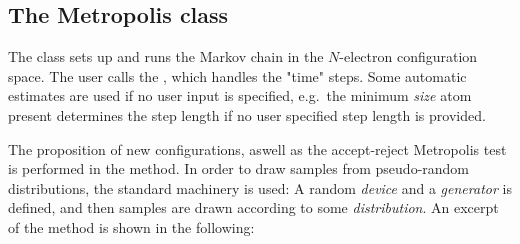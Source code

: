 \documentclass[../../master.tex]{subfiles}
\begin{document}
\subsection{The Metropolis class}
The  class sets up and runs the Markov chain in the $N$-electron configuration space. The user calls the , which handles the "time" steps. Some automatic estimates are used if no user input is specified, e.g.\ the minimum \emph{size} atom present determines the step length if no user specified step length is provided. 

The proposition of new configurations, aswell as the accept-reject Metropolis test is performed in the  method. In order to draw samples from pseudo-random distributions, the standard machinery is used: A random \emph{device} and a \emph{generator} is defined, and then samples are drawn according to some \emph{distribution}. An excerpt of the  method is shown in the following:
\end{document}
